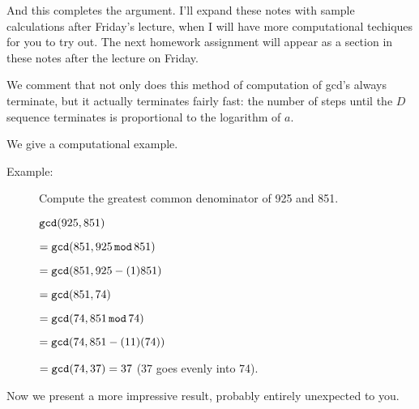\documentclass[12pt]{article}
\begin{document}
And this completes the argument.  I'll expand these notes with sample calculations after Friday's lecture, when I will have more computational techiques for you to try out.  The next homework assignment will appear as a section in these notes after the lecture on Friday.

We comment that not only does this method of computation of gcd's always terminate, but it actually terminates fairly fast:  the number of steps until the $D$ sequence terminates is proportional to the logarithm of $a$.

We give a computational example.

\begin{description}

\item[Example:]  Compute the greatest common denominator of 925 and 851.

${\tt gcd}(925,851) $ 

$= {\tt gcd}(851,925 \,{\tt mod}\, 851) $

$= {\tt gcd}(851,925 - (1)851)$

$ = {\tt gcd}(851,74) $

$= {\tt gcd}(74,851\,{\tt mod}\,74)$

$= {\tt gcd}(74,851-(11)(74))$

$= {\tt gcd}(74,37) = 37$ (37 goes evenly into 74).

\end{description}

Now we present a more impressive result, probably entirely unexpected to you.
\end{document}
